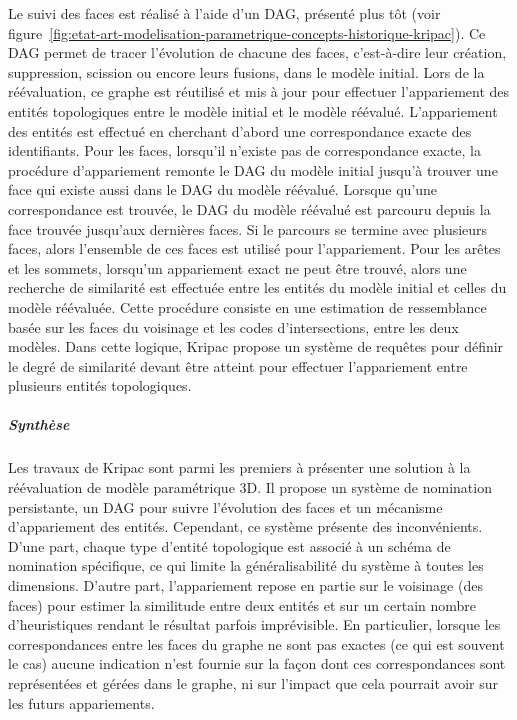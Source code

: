 Le suivi des faces est réalisé à l'aide d'un DAG, présenté plus tôt (voir
figure~\ref{fig:etat-art-modelisation-parametrique-concepts-historique-kripac}). %
Ce DAG permet de tracer l'évolution de chacune des faces, c'est-à-dire leur
création, suppression, scission ou encore leurs fusions, dans le modèle
initial. %
Lors de la réévaluation, ce graphe est réutilisé et mis à jour pour effectuer
l'appariement des entités topologiques entre le modèle initial et le modèle
réévalué. %
L'appariement des entités est effectué en cherchant d'abord une correspondance
exacte des identifiants. %
Pour les faces, lorsqu'il n'existe pas de correspondance exacte, la procédure
d'appariement remonte le DAG du modèle initial jusqu'à trouver une face qui
existe aussi dans le DAG du modèle réévalué. %
Lorsque qu'une correspondance est trouvée, le DAG du modèle réévalué est
parcouru depuis la face trouvée jusqu'aux dernières faces. %
Si le parcours se termine avec plusieurs faces, alors l'ensemble de ces faces
est utilisé pour l'appariement. %
Pour les arêtes et les sommets, lorsqu'un appariement exact ne peut être trouvé,
alors une recherche de similarité est effectuée entre les entités du modèle
initial et celles du modèle réévaluée. %
Cette procédure consiste en une estimation de ressemblance basée sur les faces
du voisinage et les codes d'intersections, entre les deux modèles. %
Dans cette logique, Kripac propose un système de requêtes pour définir le degré de
similarité devant être atteint pour effectuer l'appariement entre plusieurs
entités topologiques. %

\subparagraph*{Synthèse}

Les travaux de Kripac sont parmi les premiers à présenter une solution à la
réévaluation de modèle paramétrique 3D. %
Il propose un système de nomination persistante, un DAG pour suivre l'évolution
des faces et un mécanisme d'appariement des entités. %
Cependant, ce système présente des inconvénients. D'une part, chaque type d'entité topologique est associé à un schéma de nomination spécifique, ce qui limite la généralisabilité du système à toutes les dimensions. %
D'autre part, l'appariement repose en partie sur le voisinage (des
faces) pour estimer la similitude entre deux entités et sur un certain nombre
d'heuristiques rendant le résultat parfois imprévisible. %
En particulier, lorsque les correspondances entre les faces du graphe ne sont pas exactes (ce qui est souvent le cas) aucune indication n'est fournie sur la façon dont ces correspondances sont représentées et gérées dans le graphe, ni sur l'impact que cela pourrait avoir sur les futurs appariements. %



